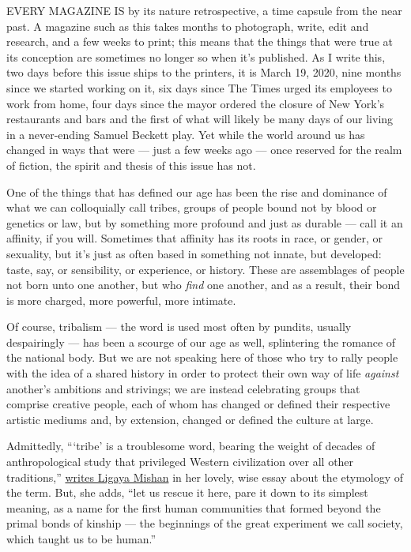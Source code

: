 EVERY MAGAZINE IS by its nature retrospective, a time capsule from the
near past. A magazine such as this takes months to photograph, write,
edit and research, and a few weeks to print; this means that the things
that were true at its conception are sometimes no longer so when it's
published. As I write this, two days before this issue ships to the
printers, it is March 19, 2020, nine months since we started working on
it, six days since The Times urged its employees to work from home, four
days since the mayor ordered the closure of New York's restaurants and
bars and the first of what will likely be many days of our living in a
never-ending Samuel Beckett play. Yet while the world around us has
changed in ways that were --- just a few weeks ago --- once reserved for
the realm of fiction, the spirit and thesis of this issue has not.

One of the things that has defined our age has been the rise and
dominance of what we can colloquially call tribes, groups of people
bound not by blood or genetics or law, but by something more profound
and just as durable --- call it an affinity, if you will. Sometimes that
affinity has its roots in race, or gender, or sexuality, but it's just
as often based in something not innate, but developed: taste, say, or
sensibility, or experience, or history. These are assemblages of people
not born unto one another, but who \emph{find} one another, and as a
result, their bond is more charged, more powerful, more intimate.

Of course, tribalism --- the word is used most often by pundits, usually
despairingly --- has been a scourge of our age as well, splintering the
romance of the national body. But we are not speaking here of those who
try to rally people with the idea of a shared history in order to
protect their own way of life \emph{against} another's ambitions and
strivings; we are instead celebrating groups that comprise creative
people, each of whom has changed or defined their respective artistic
mediums and, by extension, changed or defined the culture at large.

Admittedly, ```tribe' is a troublesome word, bearing the weight of
decades of anthropological study that privileged Western civilization
over all other traditions,''
\href{https://www.nytimes3xbfgragh.onion/interactive/2020/04/13/t-magazine/tribe-meaning.html}{writes
Ligaya Mishan} in her lovely, wise essay about the etymology of the
term. But, she adds, ``let us rescue it here, pare it down to its
simplest meaning, as a name for the first human communities that formed
beyond the primal bonds of kinship --- the beginnings of the great
experiment we call society, which taught us to be human.''

